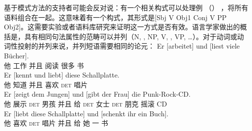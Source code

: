 基于模式方法的支持者可能会反对说：有一个相关构式可以处理例 （） ，将所有语料组合在一起。这意味着有一个构式，其形式是[Sbj V Obj1 Conj V PP Obj2]。这需要实验或者语料库研究来证明这一方式是否有效。语言学家做出的概括是，具有相同句法属性的范畴可以并列（N, \nbar, NP, V, \vbar, VP, \ldots）。对于动词或动词性投射的并列来说，并列短语需要相同的论元：
\eal
\ex 
\gll Er [arbeitet] und [liest viele Bücher].\\
     他 \spacebr{}工作 并且 \spacebr{}阅读 很多 书\\
\ex 
\gll Er [kennt und liebt] diese Schallplatte.\\
     他 \spacebr{}知道 并且 喜欢 \textsc{det} 唱片\\
\ex 
\gll Er [zeigt dem Jungen] und [gibt der Frau] die Punk-Rock-CD.\\
     他 \spacebr{}展示 \textsc{det} 男孩 并且 \spacebr{}给 \textsc{det} 女士 \textsc{det} {朋克 摇滚 CD}\\
\ex 
\gll Er [liebt diese Schallplatte] und [schenkt ihr ein Buch].\\
     他 \spacebr{}喜欢 \textsc{det} 唱片 并且 \spacebr{}给 她 一 书\\
